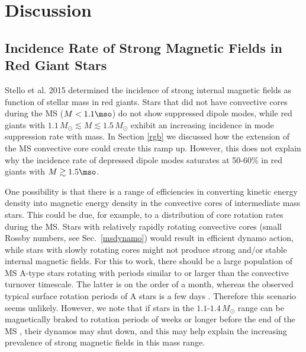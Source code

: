 \section{Discussion}
\begin{itemize}
\end{itemize}

\subsection{Incidence Rate of Strong Magnetic Fields in Red Giant Stars}
Stello et al. 2015 determined the incidence of strong internal magnetic fields as function of stellar mass in red giants. Stars that did not have convective cores during the MS ($M<1.1\mso$) do not show suppressed dipole modes, while red giants with $1.1 \, M_\odot \lesssim M \lesssim 1.5 \, M_\odot$ exhibit an increasing incidence in mode suppression rate with mass. In Section \ref{rgb} we discussed how the extension of the MS convective core could create this ramp up. However, this does not explain why the incidence rate of depressed dipole modes saturates at 50-60\% in red giants with $M \gtrsim 1.5 \mso$.

One possibility is that there is a range of efficiencies in converting kinetic energy density into magnetic energy density in the convective cores of intermediate mass stars. This could be due, for example, to a distribution of core rotation rates during the MS. Stars with relatively rapidly rotating convective cores (small Rossby numbers, see Sec.~\ref{msdynamo}) would result in efficient dynamo action, while stars with slowly rotating cores might not produce strong and/or stable internal magnetic fields. For this to work, there should be a large population of MS A-type stars rotating with periods similar to or larger than the convective turnover timescale. The latter is on the order of a month, whereas the observed typical surface rotation periods of A stars is a few days \citep{Zorec_2012}.
Therefore this scenario seems unlikely. However, we note that if stars in the $1.1$-$1.4 \, M_\odot$ range can be magnetically braked to rotation periods of weeks or longer before the end of the MS \citep[see][]{VanSaders_2013}, their dynamos may shut down, and this may help explain the increasing prevalence of strong magnetic fields in this mass range.

